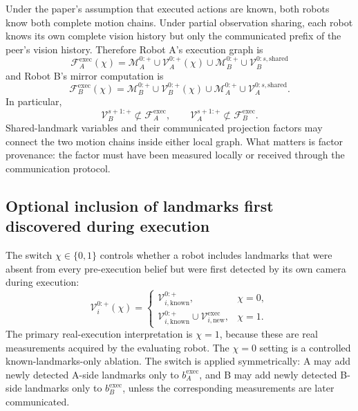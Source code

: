 \documentclass[11pt,a4paper]{article}
\begin{document}
Under the paper's assumption that executed actions are known, both robots know
both complete motion chains.  Under partial observation sharing, each robot
knows its own complete vision history but only the communicated prefix of the
peer's vision history.  Therefore Robot A's execution graph is
\begin{equation}
 \boxed{
 \mathcal F_A^{\mathrm{exec}}(\chi)
 =\mathcal M_A^{0:+}
  \cup\mathcal V_A^{0:+}(\chi)
  \cup\mathcal M_B^{0:+}
  \cup\mathcal V_B^{0:s,\mathrm{shared}} }
 \label{eq:definitive-factor-a}
\end{equation}
and Robot B's mirror computation is
\begin{equation}
 \boxed{
 \mathcal F_B^{\mathrm{exec}}(\chi)
 =\mathcal M_B^{0:+}
  \cup\mathcal V_B^{0:+}(\chi)
  \cup\mathcal M_A^{0:+}
  \cup\mathcal V_A^{0:s,\mathrm{shared}} .}
 \label{eq:definitive-factor-b}
\end{equation}
In particular,
\[
 \mathcal V_B^{s+1:+}\not\subset\mathcal F_A^{\mathrm{exec}},
 \qquad
 \mathcal V_A^{s+1:+}\not\subset\mathcal F_B^{\mathrm{exec}}.
\]
Shared-landmark variables and their communicated projection factors may connect
the two motion chains inside either local graph.  What matters is factor
provenance: the factor must have been measured locally or received through the
communication protocol.

\subsection{Optional inclusion of landmarks first discovered during execution}

The switch $\chi\in\{0,1\}$ controls whether a robot includes landmarks that
were absent from every pre-execution belief but were first detected by its own
camera during execution:
\[
 \mathcal V_i^{0:+}(\chi)=
 \begin{cases}
  \mathcal V_{i,\mathrm{known}}^{0:+}, & \chi=0,\\
  \mathcal V_{i,\mathrm{known}}^{0:+}
   \cup\mathcal V_{i,\mathrm{new}}^{\mathrm{exec}}, & \chi=1.
 \end{cases}
\]
The primary real-execution interpretation is $\chi=1$, because these are real
measurements acquired by the evaluating robot.  The $\chi=0$ setting is a
controlled known-landmarks-only ablation.  The switch is applied symmetrically:
A may add newly detected A-side landmarks only to $b_A^{\mathrm{exec}}$, and B
may add newly detected B-side landmarks only to $b_B^{\mathrm{exec}}$, unless
the corresponding measurements are later communicated.
\end{document}
